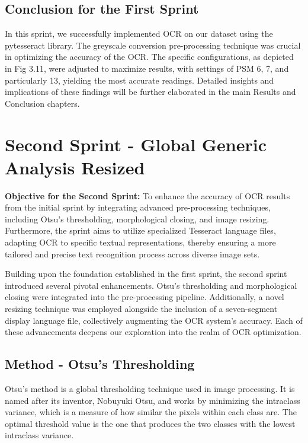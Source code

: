 \subsection{Conclusion for the First Sprint}
In this sprint, we successfully implemented OCR on our dataset using the pytesseract library. The greyscale conversion pre-processing technique was crucial in optimizing the accuracy of the OCR. The specific configurations, as depicted in Fig 3.11, were adjusted to maximize results, with settings of PSM 6, 7, and particularly 13, yielding the most accurate readings. Detailed insights and implications of these findings will be further elaborated in the main Results and Conclusion chapters.

\newpage

\section{Second Sprint - Global Generic Analysis Resized}

\textbf{Objective for the Second Sprint:}
To enhance the accuracy of OCR results from the initial sprint by integrating advanced pre-processing techniques, including Otsu's thresholding, morphological closing, and image resizing. Furthermore, the sprint aims to utilize specialized Tesseract language files, adapting OCR to specific textual representations, thereby ensuring a more tailored and precise text recognition process across diverse image sets.

Building upon the foundation established in the first sprint, the second sprint introduced several pivotal enhancements. Otsu's thresholding and morphological closing were integrated into the pre-processing pipeline. Additionally, a novel resizing technique was employed alongside the inclusion of a seven-segment display language file, collectively augmenting the OCR system's accuracy. Each of these advancements deepens our exploration into the realm of OCR optimization.

\subsection*{Method - Otsu's Thresholding}

Otsu's method is a global thresholding technique used in image processing. It is named after its inventor, Nobuyuki Otsu, and works by minimizing the intraclass variance, which is a measure of how similar the pixels within each class are. The optimal threshold value is the one that produces the two classes with the lowest intraclass variance. \cite{garciaDetectionClassificationPathogens2021}

